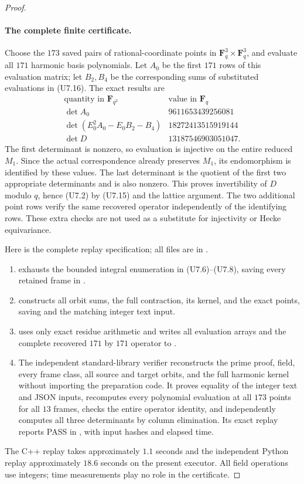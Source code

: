 \begin{proof}
\paragraph{The complete finite certificate.}
Choose the $173$ saved pairs of rational-coordinate points in
$\mathbf F_q^3\times\mathbf F_q^3$, and evaluate all $171$
harmonic basis polynomials. Let $A_0$ be the first $171$ rows of
this evaluation matrix; let $B_2,B_4$ be the corresponding sums
of substituted evaluations in (U7.16). The exact results are
\[
 \begin{array}{c|r}
 \text{quantity in }\mathbf F_{q^2}&\text{value in }\mathbf F_q\\ \hline
 \det A_0&9611653439256081\\
 \det(E_0^2A_0-E_0B_2-B_4)&18272413515919144\\
 \det D&13187546903051047.
 \end{array}
 \tag{U7.17}
\]
The first determinant is nonzero, so evaluation is injective on
the entire reduced $M_1$. Since the actual correspondence already
preserves $M_1$, its endomorphism is identified by these values.
The last determinant is the quotient of the first two appropriate
determinants and is also nonzero. This proves invertibility of
$D$ modulo $q$, hence (U7.2) by (U7.15) and the lattice argument.
The two additional point rows verify the same recovered operator
independently of the identifying rows. These extra checks are not
used as a substitute for injectivity or Hecke equivariance.

Here is the complete replay specification; all files are in
.
\begin{enumerate}
\item {} exhausts the bounded integral
      enumeration in (U7.6)--(U7.8), saving every retained frame
      in .
\item {} constructs all orbit sums, the full
      contraction, its kernel, and the exact points, saving
       and the matching integer text input.
\item {} uses only exact residue arithmetic
      and writes all evaluation arrays and the complete recovered
      $171$ by $171$ operator to .
\item The independent standard-library verifier
       reconstructs the prime proof, field,
      every frame class, all source and target orbits, and the full
      harmonic kernel without importing the preparation code. It
      proves equality of the integer text and JSON inputs,
      recomputes every polynomial evaluation at all $173$ points
      for all $13$ frames, checks the entire operator identity,
      and independently computes all three determinants by
      column elimination. Its exact replay reports PASS in
      , with input hashes and elapsed time.
\end{enumerate}
The C++ replay takes approximately $1.1$ seconds and the independent
Python replay approximately $18.6$ seconds on the present executor.
All field operations use integers; time measurements play no role
in the certificate.


\end{proof}
